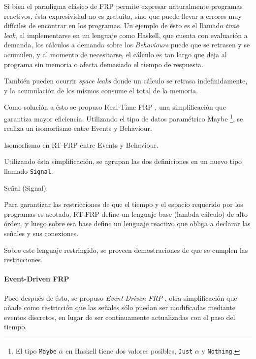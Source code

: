 
  Si bien el paradigma clásico de FRP permite expresar naturalmente
programas reactivos, ésta expresividad no es gratuita, sino que
puede llevar a errores muy difíciles de encontrar en los programas.
  Un ejemplo de ésto es el llamado \emph{time leak}, al implementarse
en un lenguaje como Haskell, que cuenta con evaluación a demanda,
los cálculos a demanda sobre los \emph{Behaviours} puede que se
retrasen y se acumulen, y al momento de necesitarse, el cálculo
es tan largo que deja al programa sin memoria o afecta demasiado
el tiempo de respuesta.

  También pueden ocurrir \emph{space leaks} donde un cálculo se
retrasa indefinidamente, y la acumulación de los mismos consume
el total de la memoria.

  Como solución a ésto se propuso
Real-Time FRP \cite{wan2001:rtfrp}, una simplificación que
garantiza mayor eficiencia.
  Utilizando el tipo de datos paramétrico Maybe
  \footnote{
    El tipo \texttt{Maybe} $\alpha$ en Haskell tiene dos
    valores posibles,
    \texttt{Just} $\alpha$ y \texttt{Nothing}.
  },
  se realiza un isomorfismo entre Events y Behaviour.

\begin{definicion}
  Isomorfismo en RT-FRP entre Events y Behaviour.
\end{definicion}

  Utilizando ésta simplificación, se agrupan las dos definiciones en un
  nuevo tipo llamado \texttt{Signal}.

\begin{definicion}
  Señal (Signal).
\end{definicion}

  Para garantizar las restricciones de que el tiempo y el espacio requerido
por los programas es acotado, RT-FRP define un lenguaje base (lambda cálculo)
de alto órden, y luego sobre esa base define un lenguaje reactivo que obliga
a declarar las señales y sus conexiones.

  Sobre este lenguaje restringido, se proveen demostraciones de que
se cumplen las restricciones.

\paragraph{Event-Driven FRP}
  Poco después de ésto, se propuso \textit{Event-Driven FRP}
\cite{wan2002:edfrp}, otra simplificación que añade como restricción
que las señales sólo puedan ser modificadas mediante eventos discretos,
en lugar de ser contínuamente actualizadas con el paso del tiempo.

